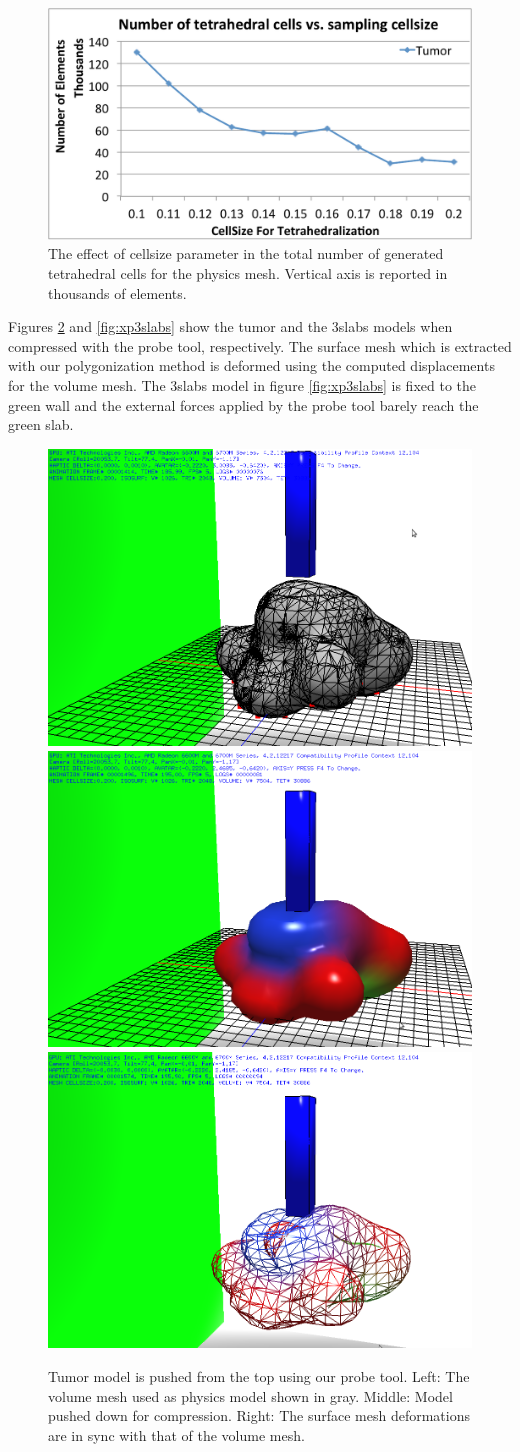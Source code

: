 \begin{figure}[H]
  \centering
  \includegraphics[width=0.8 \linewidth]{figures/deformable/cellsize_elements.pdf}
  \caption{\label{fig:cellsize_elements}
  {The effect of cellsize parameter in the total number of generated tetrahedral cells for the physics mesh.
  Vertical axis is reported in thousands of elements.}
}
\end{figure}

Figures \ref{fig:xptumor} and \ref{fig:xp3slabs} show the tumor and the 3slabs models when compressed with 
the probe tool, respectively. The surface mesh which is extracted with our polygonization method is 
deformed using the computed displacements for the volume mesh. The 3slabs model 
in figure \ref{fig:xp3slabs} is fixed to the green wall and the external forces applied by the probe tool 
barely reach the green slab. 

\begin{figure}[H]
  \centering
  \includegraphics[width=0.30\linewidth]{figures/deformable/shots/tumor01.png}
  \includegraphics[width=0.30\linewidth]{figures/deformable/shots/tumor02.png}
  \includegraphics[width=0.30\linewidth]{figures/deformable/shots/tumor03.png}
 
  \caption{\label{fig:xptumor}
  {Tumor model is pushed from the top using our probe tool. Left: The volume mesh used as physics 
  model shown in gray. Middle: Model pushed down for compression. Right: The surface mesh deformations
  are in sync with that of the volume mesh.}
}
\end{figure}


